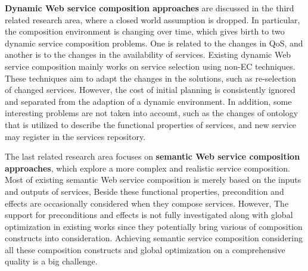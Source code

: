 \textbf{Dynamic Web service composition approaches} are discussed in the third related research area, where a closed world assumption is dropped. In particular, the composition environment is changing over time, which gives birth to two dynamic service composition problems. One is related to the changes in QoS, and another is to the changes in the availability of services. Existing dynamic Web service composition mainly works on service selection using non-EC techniques. These techniques aim to adapt the changes in the solutions, such as re-selection of changed services. However, the cost of initial planning is consistently ignored and separated from the adaption of a dynamic environment. In addition, some interesting problems are not taken into account, such as the changes of ontology that is utilized to describe the functional properties of services,  and new service may register in the services repository.

The last related research area focuses on \textbf{semantic Web service composition approaches}, which explore a more complex and realistic service composition. Most of existing semantic Web service composition is merely based on the inputs and outputs of services, Beside these functional properties,  precondition and effects are occasionally considered when they compose services. However,   The support for preconditions and effects is not fully investigated along with global optimization in existing works since they potentially bring various of composition constructs into consideration. Achieving semantic service composition considering all these composition constructs and global optimization on a comprehensive quality is a big challenge.

